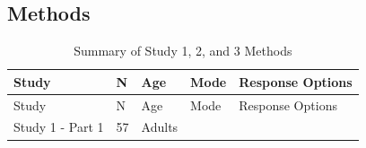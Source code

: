 \documentclass[oneside]{report}
\theoremstyle{definition}
\theoremstyle{definition}
\theoremstyle{definition}
\theoremstyle{remark}
\begin{document}
\subsection{Methods}\label{methods-2}
\begin{longtable}[]{@{}lllll@{}}
\caption{\label{tab:study3info} Summary of Study 1, 2, and 3
Methods}\tabularnewline
\toprule
\begin{minipage}[b]{0.19\columnwidth}\raggedright\strut
Study\strut
\end{minipage} & \begin{minipage}[b]{0.02\columnwidth}\raggedright\strut
N\strut
\end{minipage} & \begin{minipage}[b]{0.20\columnwidth}\raggedright\strut
Age\strut
\end{minipage} & \begin{minipage}[b]{0.11\columnwidth}\raggedright\strut
Mode\strut
\end{minipage} & \begin{minipage}[b]{0.32\columnwidth}\raggedright\strut
Response Options\strut
\end{minipage}\tabularnewline
\midrule
\endfirsthead
\toprule
\begin{minipage}[b]{0.19\columnwidth}\raggedright\strut
Study\strut
\end{minipage} & \begin{minipage}[b]{0.02\columnwidth}\raggedright\strut
N\strut
\end{minipage} & \begin{minipage}[b]{0.20\columnwidth}\raggedright\strut
Age\strut
\end{minipage} & \begin{minipage}[b]{0.11\columnwidth}\raggedright\strut
Mode\strut
\end{minipage} & \begin{minipage}[b]{0.32\columnwidth}\raggedright\strut
Response Options\strut
\end{minipage}\tabularnewline
\midrule
\endhead
\begin{minipage}[t]{0.19\columnwidth}\raggedright\strut
Study 1 - Part 1\strut
\end{minipage} & \begin{minipage}[t]{0.02\columnwidth}\raggedright\strut
57\strut
\end{minipage} & \begin{minipage}[t]{0.20\columnwidth}\raggedright\strut
Adults\strut
\end{minipage} & \begin{minipage}[t]{0.11\columnwidth}\raggedright\strut

\end{minipage}
\end{longtable}
\end{document}
